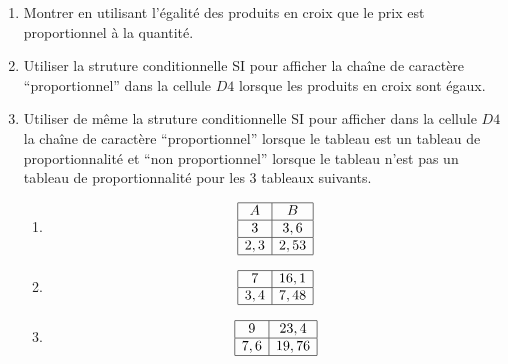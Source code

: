 \documentclass{article}
\begin{document}
\begin{enumerate}[leftmargin=0cm,itemindent=.5cm,labelwidth=\itemindent,labelsep=0cm,align=left,label=\arabic*)]

\item Montrer en utilisant l'égalité des produits en croix que le prix est proportionnel à la quantité. 
\item Utiliser la struture conditionnelle SI pour afficher la chaîne de caractère ``proportionnel'' dans la cellule $D4$ lorsque les produits en croix sont égaux.




\item Utiliser de même la struture conditionnelle SI pour afficher dans la cellule $D4$
  la chaîne de caractère ``proportionnel''  lorsque le tableau est un tableau de proportionnalité
  et ``non proportionnel'' lorsque le tableau n'est pas un tableau de proportionnalité pour les $3$ tableaux suivants.


  \begin{enumerate}[leftmargin=0cm,itemindent=.5cm,labelwidth=\itemindent,labelsep=0cm,align=left,label=\alph*)]
    
  \item 
    \begin{equation*}
      \begin{array}{|c|c|}
        \hline
        A & B \\
        \hline
        3 & 3,6 \\
        \hline
        2,3 & 2,53 \\
        \hline
      \end{array}
    \end{equation*}
    
  \item 
    \begin{equation*}
      \begin{array}{|c|c|}
        \hline
        7 & 16,1 \\
        \hline
        3,4 & 7,48 \\
        \hline
      \end{array}
    \end{equation*}
    
  \item 
    \begin{equation*}
      \begin{array}{|c|c|}
        \hline
        9 & 23,4 \\
        \hline
        7,6 & 19,76 \\
        \hline
      \end{array}
    \end{equation*}
    
  \end{enumerate}
  
\end{enumerate}
\end{document}
